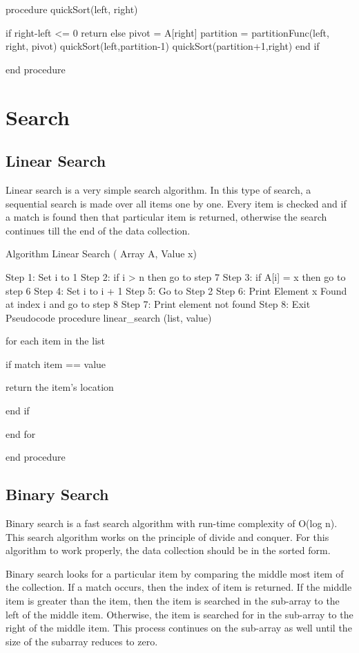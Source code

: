 procedure quickSort(left, right)

   if right-left <= 0
      return
   else
      pivot = A[right]
      partition = partitionFunc(left, right, pivot)
      quickSort(left,partition-1)
      quickSort(partition+1,right)
   end if

end procedure

\section{Search}

\subsection{Linear Search}

Linear search is a very simple search algorithm. In this type of search, a sequential search is made over all items one by one. Every item is checked and if a match is found then that particular item is returned, otherwise the search continues till the end of the data collection.



Algorithm
Linear Search ( Array A, Value x)

Step 1: Set i to 1
Step 2: if i > n then go to step 7
Step 3: if A[i] = x then go to step 6
Step 4: Set i to i + 1
Step 5: Go to Step 2
Step 6: Print Element x Found at index i and go to step 8
Step 7: Print element not found
Step 8: Exit
Pseudocode
procedure linear_search (list, value)

   for each item in the list

      if match item == value

         return the item's location

      end if

   end for

end procedure

\subsection{Binary Search}

Binary search is a fast search algorithm with run-time complexity of Ο(log n). This search algorithm works on the principle of divide and conquer. For this algorithm to work properly, the data collection should be in the sorted form.

Binary search looks for a particular item by comparing the middle most item of the collection. If a match occurs, then the index of item is returned. If the middle item is greater than the item, then the item is searched in the sub-array to the left of the middle item. Otherwise, the item is searched for in the sub-array to the right of the middle item. This process continues on the sub-array as well until the size of the subarray reduces to zero.

